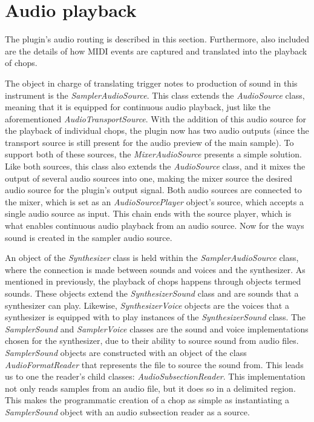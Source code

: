 \documentclass[12pt, a4paper, hidelinks]{report}
\begin{document}
	\section{Audio playback}
	The plugin's audio routing is described in this section. Furthermore, also included are the details of how MIDI events are captured and translated into the playback of chops.\par
	The object in charge of translating trigger notes to production of sound in this instrument is the \textit{SamplerAudioSource}. This class extends the \textit{AudioSource} class, meaning that it is equipped for continuous audio playback, just like the aforementioned \textit{AudioTransportSource}. With the addition of this audio source for the playback of individual chops, the plugin now has two audio outputs (since the transport source is still present for the audio preview of the main sample). To support both of these sources, the \textit{MixerAudioSource} presents a simple solution. Like both sources, this class also extends the \textit{AudioSource} class, and it mixes the output of several audio sources into one, making the mixer source the desired audio source for the plugin's output signal. Both audio sources are connected to the mixer, which is set as an \textit{AudioSourcePlayer} object's source, which accepts a single audio source as input. This chain ends with the source player, which is what enables continuous audio playback from an audio source. Now for the ways sound is created in the sampler audio source. \par
	
	An object of the \textit{Synthesizer} class is held within the \textit{SamplerAudioSource} class, where the connection is made between sounds and voices and the synthesizer. As mentioned in previously, the playback of chops happens through objects termed sounds. These objects extend the \textit{SynthesizerSound} class and are sounds that a synthesizer can play. Likewise, \textit{SynthesizerVoice} objects are the voices that a synthesizer is equipped with to play instances of the \textit{SynthesizerSound} class. The \textit{SamplerSound} and \textit{SamplerVoice} classes are the sound and voice implementations chosen for the synthesizer, due to their ability to source sound from audio files. \textit{SamplerSound} objects are constructed with an object of the class \textit{AudioFormatReader} that represents the file to source the sound from. This leads us to one the reader's child classes: \textit{AudioSubsectionReader}. This implementation not only reads samples from an audio file, but it does so in a delimited region. This makes the programmatic  creation of a chop as simple as instantiating a \textit{SamplerSound} object with an audio subsection reader as a source. \par
	
\end{document}
